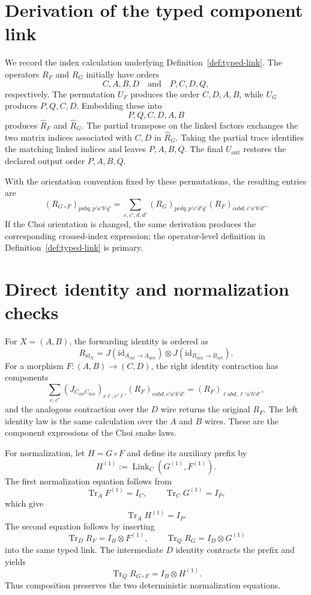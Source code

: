 \documentclass[11pt,a4paper]{article}
\theoremstyle{definition}
\theoremstyle{plain}
\theoremstyle{remark}
\DeclareMathOperator{\Tr}{Tr}
\newcommand{\id}{\mathrm{id}}
\begin{document}
\section{Derivation of the typed component link}
\label{app:component-link}

We record the index calculation underlying Definition~\ref{def:typed-link}.
The operators $R_F$ and $R_G$ initially have orders
\[
C,A,B,D\quad\text{and}\quad P,C,D,Q,
\]
respectively. The permutation $U_F$ produces the order $C,D,A,B$, while
$U_G$ produces $P,Q,C,D$. Embedding these into
\[
P,Q,C,D,A,B
\]
produces $\widehat R_F$ and $\widehat R_G$. The partial transpose on the
linked factors exchanges the two matrix indices associated with $C,D$ in
$\widehat R_G$. Taking the partial trace identifies the matching linked
indices and leaves $P,A,B,Q$. The final $U_{\mathrm{out}}$ restores the
declared output order $P,A,B,Q$.

With the orientation convention fixed by these permutations, the resulting
entries are
\[
(R_{G\circ F})_{pabq,p'a'b'q'}
=
\sum_{c,c',d,d'}
(R_G)_{pcdq,p'c'd'q'}
(R_F)_{cabd,c'a'b'd'}.
\]
If the Choi orientation is changed, the same derivation produces the
corresponding crossed-index expression; the operator-level definition in
Definition~\ref{def:typed-link} is primary.

\section{Direct identity and normalization checks}
\label{app:category-checks}

For $X=(A,B)$, the forwarding identity is ordered as
\[
R_{\id_X}
=
J(\id_{A_{\mathrm{ext}}\to A_{\mathrm{slot}}})
\otimes
J(\id_{B_{\mathrm{slot}}\to B_{\mathrm{ext}}}).
\]
For a morphism $F:(A,B)\to(C,D)$, the right identity contraction has
components
\[
\sum_{c,c'}
(J_{C_{\mathrm{ext}}C_{\mathrm{slot}}})_{c\ell,c'\ell'}
(R_F)_{c a b d,c'a'b'd'}
=
(R_F)_{\ell a b d,\ell'a'b'd'},
\]
and the analogous contraction over the $D$ wire returns the original
$R_F$. The left identity law is the same calculation over the $A$ and
$B$ wires. These are the component expressions of the Choi snake laws.

For normalization, let $H=G\circ F$ and define its auxiliary prefix by
\[
H^{(1)}:=\operatorname{Link}_{C}(G^{(1)},F^{(1)}).
\]
The first normalization equation follows from
\[
\Tr_A F^{(1)}=I_C,
\qquad
\Tr_C G^{(1)}=I_P,
\]
which give
\[
\Tr_AH^{(1)}=I_P.
\]
The second equation follows by inserting
\[
\Tr_D R_F=I_B\otimes F^{(1)},
\qquad
\Tr_Q R_G=I_D\otimes G^{(1)}
\]
into the same typed link. The intermediate $D$ identity contracts the
prefix and yields
\[
\Tr_QR_{G\circ F}=I_B\otimes H^{(1)}.
\]
Thus composition preserves the two deterministic normalization equations.
\end{document}
